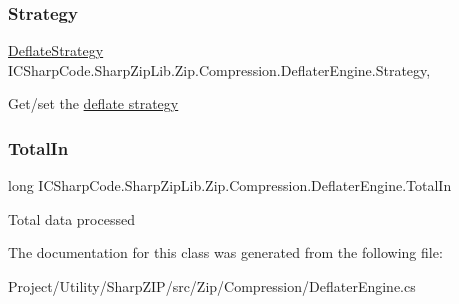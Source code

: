 \subsubsection{\texorpdfstring{Strategy}{Strategy}}
{\footnotesize\ttfamily \hyperlink{namespace_i_c_sharp_code_1_1_sharp_zip_lib_1_1_zip_1_1_compression_a922c175879503e6b9e35641deccfbc40}{Deflate\+Strategy} I\+C\+Sharp\+Code.\+Sharp\+Zip\+Lib.\+Zip.\+Compression.\+Deflater\+Engine.\+Strategy\hspace{0.3cm}{\ttfamily [get]}, {\ttfamily [set]}}



Get/set the \hyperlink{namespace_i_c_sharp_code_1_1_sharp_zip_lib_1_1_zip_1_1_compression_a922c175879503e6b9e35641deccfbc40}{deflate strategy} 

\mbox{\label{class_i_c_sharp_code_1_1_sharp_zip_lib_1_1_zip_1_1_compression_1_1_deflater_engine_ac3bade0bd988aff92742075afeb0c69d}} 
\subsubsection{\texorpdfstring{Total\+In}{TotalIn}}
{\footnotesize\ttfamily long I\+C\+Sharp\+Code.\+Sharp\+Zip\+Lib.\+Zip.\+Compression.\+Deflater\+Engine.\+Total\+In\hspace{0.3cm}{\ttfamily [get]}}



Total data processed 



The documentation for this class was generated from the following file\+:\begin{DoxyCompactItemize}
\item 
Project/\+Utility/\+Sharp\+Z\+I\+P/src/\+Zip/\+Compression/Deflater\+Engine.\+cs\end{DoxyCompactItemize}
